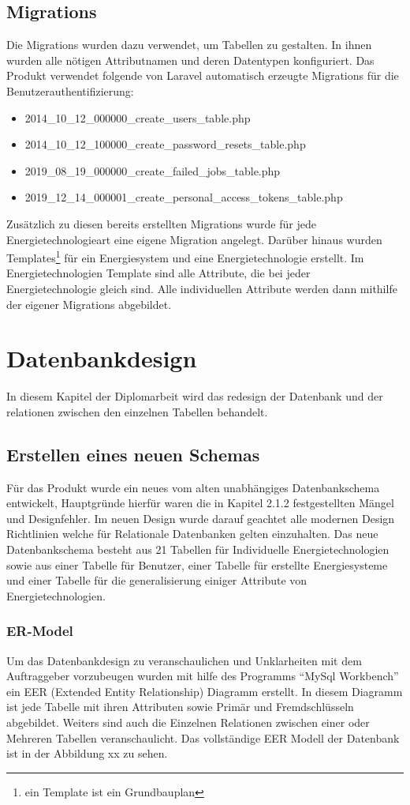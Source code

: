 \subsection{Migrations}
Die Migrations wurden dazu verwendet, um Tabellen zu gestalten. In ihnen wurden alle nötigen Attributnamen und deren Datentypen konfiguriert. Das Produkt verwendet folgende von Laravel automatisch erzeugte Migrations für die Benutzerauthentifizierung: 
\begin{itemize}
\item 2014\_10\_12\_000000\_create\_users\_table.php
\item 2014\_10\_12\_100000\_create\_password\_resets\_table.php
\item 2019\_08\_19\_000000\_create\_failed\_jobs\_table.php
\item 2019\_12\_14\_000001\_create\_personal\_access\_tokens\_table.php
\end{itemize}
Zusätzlich zu diesen bereits erstellten Migrations wurde für jede Energietechnologieart eine eigene Migration angelegt. Darüber hinaus wurden Templates\footnote{ein Template ist ein Grundbauplan} für ein Energiesystem und eine Energietechnologie erstellt. Im Energietechnologien Template sind alle Attribute, die bei jeder Energietechnologie gleich sind. Alle individuellen Attribute werden dann mithilfe der eigener Migrations abgebildet.
\newpage

\section{Datenbankdesign}
In diesem Kapitel der Diplomarbeit wird das redesign der Datenbank und der relationen zwischen den einzelnen Tabellen behandelt.


\subsection{Erstellen eines neuen Schemas}
Für das Produkt wurde ein neues vom alten unabhängiges Datenbankschema entwickelt, Hauptgründe hierfür waren die in Kapitel 2.1.2 festgestellten Mängel und Designfehler. Im neuen Design wurde darauf geachtet alle modernen Design Richtlinien welche für Relationale Datenbanken gelten einzuhalten. Das neue Datenbankschema besteht aus 21 Tabellen für Individuelle Energietechnologien sowie aus einer Tabelle für Benutzer, einer Tabelle für erstellte Energiesysteme und einer Tabelle für die generalisierung einiger Attribute von Energietechnologien.

\subsubsection{ER-Model}
Um das Datenbankdesign zu veranschaulichen und Unklarheiten mit dem Auftraggeber vorzubeugen wurden mit hilfe des Programms “MySql Workbench” ein EER (Extended Entity Relationship) Diagramm erstellt. In diesem Diagramm ist jede Tabelle mit ihren Attributen sowie Primär und Fremdschlüsseln abgebildet. Weiters sind auch die Einzelnen Relationen zwischen einer oder Mehreren Tabellen veranschaulicht. Das vollständige EER Modell der Datenbank ist in der Abbildung xx zu sehen.

